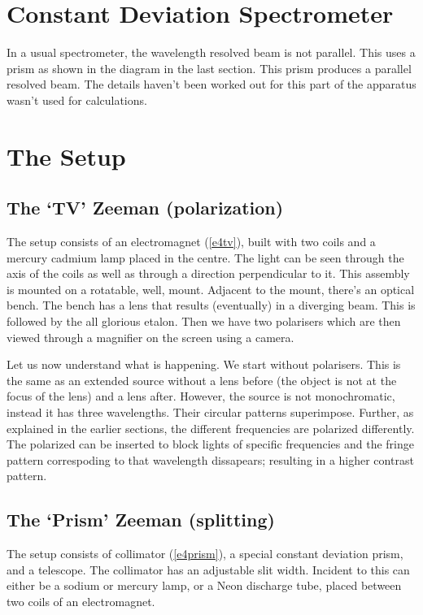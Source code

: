 \section{Constant Deviation Spectrometer}

In a usual spectrometer, the wavelength resolved beam is not parallel.
This uses a prism as shown in the diagram in the last section. This prism
produces a parallel resolved beam. The details haven't been worked
out for this part of the apparatus wasn't used for calculations.


\section{The Setup}


\subsection{The `TV' Zeeman (polarization)}

The setup consists of an electromagnet (\autoref{e4tv}), built with two coils and a
mercury cadmium lamp placed in the centre. The light can be seen through
the axis of the coils as well as through a direction perpendicular
to it. This assembly is mounted on a rotatable, well, mount. Adjacent
to the mount, there's an optical bench. The bench has a lens that
results (eventually) in a diverging beam. This is followed by the
all glorious etalon. Then we have two polarisers which are then viewed
through a magnifier on the screen using a camera.

Let us now understand what is happening. We start without polarisers.
This is the same as an extended source without a lens before (the
object is not at the focus of the lens) and a lens after. However,
the source is not monochromatic, instead it has three wavelengths.
Their circular patterns superimpose. Further, as explained in the
earlier sections, the different frequencies are polarized differently.
The polarized can be inserted to block lights of specific frequencies
and the fringe pattern correspoding to that wavelength dissapears;
resulting in a higher contrast pattern.


\subsection{The `Prism' Zeeman (splitting)}

The setup consists of collimator (\autoref{e4prism}), a special constant deviation prism,
and a telescope. The collimator has an adjustable slit width. Incident
to this can either be a sodium or mercury lamp, or a Neon discharge
tube, placed between two coils of an electromagnet. 

